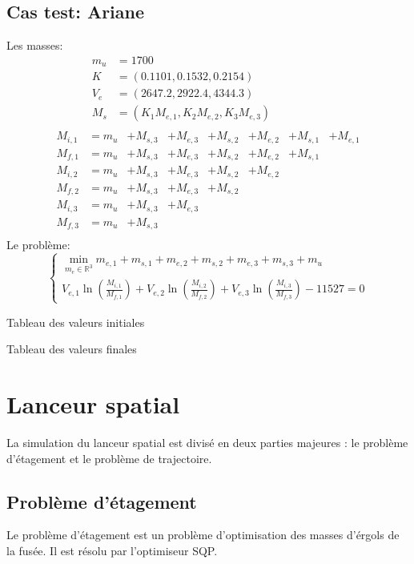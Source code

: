 \documentclass[a4paper,20pt]{article}
\begin{document}
\subsection{Cas test: Ariane}
Les masses:
\begin{align*}
m_u &= 1700 & & & & & & \\
K &= (0.1101, 0.1532, 0.2154) & & & & & & \\
V_e &= (2647.2, 2922.4, 4344.3) & & & & & & \\
M_s &= (K_1M_{e,1}, K_2M_{e,2}, K_3M_{e,3}) & & & & & & \\
\end{align*}
\begin{align*}
M_{i,1} &= m_u &+ M_{s,3} &+ M_{e,3} &+ M_{s,2} &+ M_{e,2} &+ M_{s,1} &+ M_{e,1}
 \\
M_{f,1} &= m_u &+ M_{s,3} &+ M_{e,3} &+ M_{s,2} &+ M_{e,2} &+ M_{s,1} & \\
M_{i,2} &= m_u &+ M_{s,3} &+ M_{e,3} &+ M_{s,2} &+ M_{e,2} & & \\
M_{f,2} &= m_u &+ M_{s,3} &+ M_{e,3} &+ M_{s,2} & & & \\
M_{i,3} &= m_u &+ M_{s,3} &+ M_{e,3} & & & & \\
M_{f,3} &= m_u &+ M_{s,3} & & & & & \\
\end{align*}
Le probl\`eme:
\begin{equation*}
\begin{cases}
\min\limits_{m_e\in\mathbb{R}^3}{m_{e,1}+m_{s,1}+m_{e,2}+m_{s,2}+m_{e,3}+m_{s,3}
+m_u} \\
V_{e,1}\ln\left(\frac{M_{i,1}}{M_{f,1}}\right)
+V_{e,2}\ln\left(\frac{M_{i,2}}{M_{f,2}}\right)
+V_{e,3}\ln\left(\frac{M_{i,3}}{M_{f,3}}\right)-11527=0
\end{cases}
\end{equation*}

Tableau des valeurs initiales

Tableau des valeurs finales

\section{Lanceur spatial}
La simulation du lanceur spatial est divis\'e en deux parties majeures : le
 probl\`eme d'\'etagement et le probl\`eme de trajectoire.

\subsection{Probl\`eme d'\'etagement}
Le probl\`eme d'\'etagement est un probl\`eme d'optimisation des masses
 d'\'ergols de la fus\'ee. Il est r\'esolu par l'optimiseur SQP.
\end{document}
